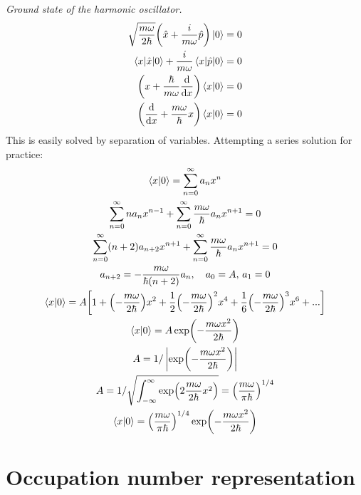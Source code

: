 \documentclass{report}
\begin{document}
\begin{subquests}
	\item \emph{Ground state of the harmonic oscillator.}
	\begin{align*}
		\sqrt{\frac{m\omega}{2\hbar}}\pqty{\hat{x} + \frac{i}{m\omega}\hat{p}} \ket{0} & = 0 \\
		\mel{x}{\hat{x}}{0} + \frac{i}{m\omega}\mel{x}{\hat{p}}{0} & = 0 \\
		\pqty{x + \frac{\hbar}{m\omega}\dv{x}}\ip{x}{0} & = 0 \\
		\pqty{\dv{x} + \frac{m\omega}{\hbar}x}\ip{x}{0} & = 0 
	\end{align*}
	This is easily solved by separation of variables. Attempting a series solution for practice:
	\begin{gather*}
		\ip{x}{0} = \sum_{n=0}^{\infty} a_n x^n \\
		\sum_{n=0}^{\infty}na_{n} x^{n-1} + \sum_{n=0}^{\infty}\frac{m\omega}{\hbar}a_{n}x^{n+1} = 0 \\
		\sum_{n=0}^{\infty}(n+2)a_{n+2} x^{n+1} + \sum_{n=0}^{\infty}\frac{m\omega}{\hbar}a_n x^{n+1} = 0 \\
		a_{n+2} = -\frac{m\omega}{\hbar(n+2)}a_{n},\quad a_0 = A,\, a_1 = 0 \\
		\ip{x}{0} = A\bqty{1 + \pqty{-\frac{m\omega}{2\hbar}}x^2 + \frac{1}{2}\pqty{-\frac{m\omega}{2\hbar}}^2 x^4 + \frac{1}{6}\pqty{-\frac{m\omega}{2\hbar}}^3 x^6 + ...} \\
		\ip{x}{0} = A\exp(-\frac{m\omega x^2}{2\hbar}) \\
		A = 1/\left|\exp(-\frac{m\omega x^2}{2\hbar})\right| \\
		A = 1/\sqrt{\int_{-\infty}^{\infty}\exp(2\frac{m\omega}{2\hbar}x^2)} = \pqty{\frac{m\omega}{\pi \hbar}}^{1/4}\\
		\ip{x}{0} = \pqty{\frac{m\omega}{\pi \hbar}}^{1/4}\exp(-\frac{m\omega x^2}{2\hbar})
	\end{gather*}

\end{subquests}


\chapter{Occupation number representation}
\end{document}
